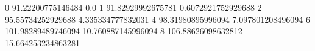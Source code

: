 0 91.22200775146484 0.0
1 91.82929992675781 0.6072921752929688
2 95.55734252929688 4.335334777832031
4 98.31980895996094 7.097801208496094
6 101.98289489746094 10.760887145996094
8 106.88626098632812 15.664253234863281
